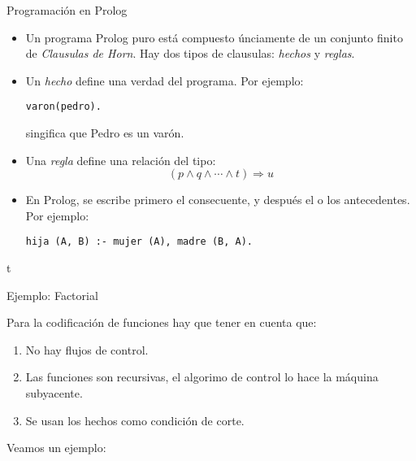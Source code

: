 \documentclass[xcolor=dvipsnames]{beamer}
\begin{document}
\begin{frame}[fragile]{Programación en Prolog}

\begin{itemize}
 \item Un programa Prolog puro está compuesto únciamente de un conjunto finito de \textit{Clausulas de Horn}. Hay dos tipos de clausulas: \textit{hechos} y \textit{reglas}.
 \item Un \textit{hecho} define una verdad del programa. Por ejemplo:
\begin{lstlisting}
varon(pedro).
\end{lstlisting}
singifica que Pedro es un varón.

 \item Una \textit{regla} define una relación del tipo: 
\[
(p \wedge q \wedge \cdots \wedge t) \Rightarrow u
\]
 \item En Prolog, se escribe primero el consecuente, y después el o los antecedentes. Por ejemplo:
\begin{lstlisting}
hija (A, B) :- mujer (A), madre (B, A).
\end{lstlisting}
\end{itemize}

\end{frame}


t\begin{frame}[fragile]{Ejemplo: Factorial}
 
Para la codificación de funciones hay que tener en cuenta que:

\begin{enumerate}
 \item No hay flujos de control.
 \item Las funciones son recursivas, el algorimo de control lo hace la máquina subyacente.
 \item Se usan los hechos como condición de corte. 
\end{enumerate}

Veamos un ejemplo:




\end{frame}
\end{document}

